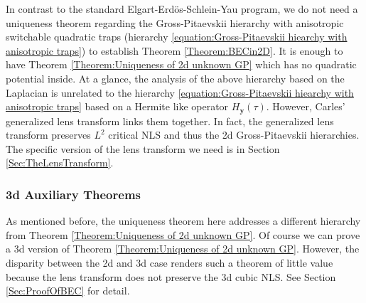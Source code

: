 \documentclass[reqno]{amsart}
\theoremstyle{plain}
\numberwithin{equation}{section}
\begin{document}
In contrast to the standard Elgart-Erd\"{o}s-Schlein-Yau program, we do not
need a uniqueness theorem regarding the Gross-Pitaevskii hierarchy with
anisotropic switchable quadratic traps (hierarchy \ref{equation:Gross-Pitaevskii hiearchy with anisotropic traps}) to establish
Theorem \ref{Theorem:BECin2D}. It is enough to have Theorem \ref{Theorem:Uniqueness of 2d unknown GP} which has no quadratic potential
inside. At a glance, the analysis of the above hierarchy based on the
Laplacian is unrelated to the hierarchy \ref{equation:Gross-Pitaevskii
hiearchy with anisotropic traps} based on a Hermite like operator $H_{\mathbf{y}}(\tau ).$ However, Carles' generalized lens transform \cite{Carles} links them together. In fact, the generalized lens transform
preserves $L^{2}$ critical NLS and thus the 2d Gross-Pitaevskii hierarchies.
The specific version of the lens transform we need is in Section \ref{Sec:TheLensTransform}.

\subsubsection{3d Auxiliary Theorems}

As mentioned before, the uniqueness theorem here addresses a different
hierarchy from Theorem \ref{Theorem:Uniqueness of 2d unknown GP}. Of course
we can prove a 3d version of Theorem \ref{Theorem:Uniqueness of 2d unknown
GP}. However, the disparity between the 2d and 3d case renders such a
theorem of little value because the lens transform does not preserve the 3d
cubic NLS. See Section \ref{Sec:ProofOfBEC} for detail.
\end{document}
